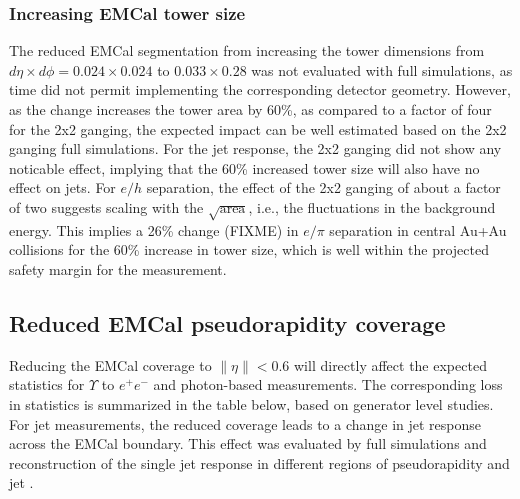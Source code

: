 \subsubsection{Increasing EMCal tower size}
The reduced EMCal segmentation from increasing the tower dimensions
from $d\eta \times d\phi = 0.024 \times 0.024$ to $0.033 \times 0.28$
was not evaluated with full \geant simulations, as time did not permit
implementing the corresponding detector geometry. However, as the
change increases the tower area by 60\%, as compared to a factor of
four for the 2x2 ganging, the expected impact can be well estimated
based on the 2x2 ganging full simulations. For the jet response, the
2x2 ganging did not show any noticable effect, implying that the 60\%
increased tower size will also have no effect on jets. For $e/h$
separation, the effect of the 2x2 ganging of about a factor of two
suggests scaling with the $\sqrt{\mbox{area}}$, i.e., the fluctuations
in the background energy. This implies a 26\% change (FIXME) in
$e/\pi$ separation in central Au+Au collisions for the 60\% increase
in tower size, which is well within the projected safety margin for
the measurement.

\subsection{Reduced EMCal pseudorapidity coverage}
Reducing the EMCal coverage to $\| \eta \| < 0.6$ will directly affect
the expected statistics for $\Upsilon$ to $e^+ e^-$ and photon-based
measurements. The corresponding loss in statistics is summarized in
the table below, based on generator level studies. For jet
measurements, the reduced coverage leads to a change in jet response
across the EMCal boundary. This effect was evaluated by full \geant
simulations and reconstruction of the single jet response in different
regions of pseudorapidity and jet \pt.

